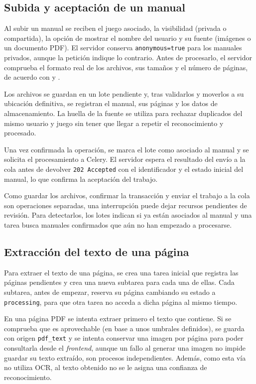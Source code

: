 \FloatBarrier
\subsection{Subida y aceptación de un manual}

Al subir un manual se reciben el juego asociado, la visibilidad (privada o
compartida), la opción de mostrar el nombre del usuario y su fuente
(imágenes o un documento \acs{PDF}). El servidor conserva
\texttt{anonymous=true} para los manuales privados, aunque la petición
indique lo contrario. Antes de
procesarlo, el servidor comprueba el formato real de los archivos, sus
tamaños y el número de páginas, de acuerdo con  y
.

Los archivos se guardan en un lote pendiente y, tras validarlos y moverlos
a su ubicación definitiva, se registran el manual, sus páginas y los datos
de almacenamiento. La huella de la fuente se utiliza para  rechazar duplicados del
mismo usuario y juego sin tener que llegar a repetir el reconocimiento y procesado.

Una vez confirmada la operación, se marca el lote como asociado al manual
y se solicita el procesamiento a Celery. El servidor espera el resultado
del envío a la cola antes de devolver \texttt{202 Accepted} con el
identificador y el estado inicial del manual, lo que confirma la aceptación
del trabajo.

Como guardar los archivos, confirmar la transacción y enviar el trabajo a
la cola son operaciones separadas, una interrupción puede dejar recursos
pendientes de revisión. Para detectarlos, los lotes indican si ya están
asociados al manual y una tarea busca manuales confirmados que aún no han
empezado a procesarse.


\FloatBarrier
\subsection{Extracción del texto de una página}

Para extraer el texto de una página, se crea una tarea inicial
que registra las páginas pendientes y crea una nueva subtarea para cada
una de ellas. Cada subtarea, antes de empezar, reserva su página cambiando su estado a \texttt{processing}, para que otra
tarea no acceda a dicha página al mismo tiempo.

En una página \acs{PDF} se intenta extraer primero el texto que contiene.
Si se comprueba que es aprovechable (en base a unos umbrales definidos), se guarda con origen
\texttt{pdf\_\allowbreak{}text} y se intenta conservar una imagen por página
para poder consultarla desde el \textit{frontend}, aunque un fallo al generar una imagen no impide guardar su
texto extraído, son procesos independientes. Además, como esta vía no utiliza \ac{OCR}, al texto obtenido no se le asigna una confianza de reconocimiento.

